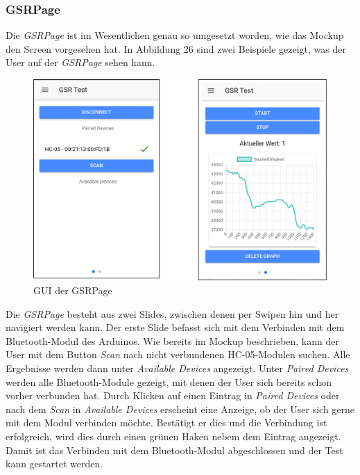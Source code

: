 \subsubsection{GSRPage}
Die \textit{GSRPage} ist im Wesentlichen genau so umgesetzt worden, wie das Mockup den Screen vorgesehen hat. In Abbildung 26 sind zwei Beispiele gezeigt, was der User auf der \textit{GSRPage} sehen kann. \newline
\begin{figure}[h]
	\centering
	\includegraphics[width=13.5cm]{Bilder/gsrpage.png}
	\caption[GUI der GSRPage]{GUI der GSRPage}
\end{figure}%
\newline
Die \textit{GSRPage} besteht aus zwei Slides, zwischen denen per Swipen hin und her navigiert werden kann. Der erste Slide befasst sich mit dem Verbinden mit dem Bluetooth-Modul des Arduinos. Wie bereits im Mockup beschrieben, kann der User mit dem Button \textit{Scan} nach nicht verbundenen HC-05-Modulen suchen. Alle Ergebnisse werden dann unter \textit{Available Devices} angezeigt. \newline Unter \textit{Paired Devices} werden alle Bluetooth-Module gezeigt, mit denen der User sich bereits schon vorher verbunden hat. Durch Klicken auf einen Eintrag in \textit{Paired Devices} oder nach dem \textit{Scan} in \textit{Available Devices} erscheint eine Anzeige, ob der User sich gerne mit dem Modul verbinden möchte. Bestätigt er dies und die Verbindung ist erfolgreich, wird dies durch einen grünen Haken nebem dem Eintrag angezeigt. Damit ist das Verbinden mit dem Bluetooth-Modul abgeschlossen und der Test kann gestartet werden. \newline
